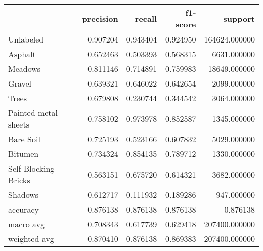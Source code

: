 \begin{tabular}{lrrrr}
\toprule
{} &  precision &    recall &  f1-score &        support \\
\midrule
Unlabeled            &   0.907204 &  0.943404 &  0.924950 &  164624.000000 \\
Asphalt              &   0.652463 &  0.503393 &  0.568315 &    6631.000000 \\
Meadows              &   0.811146 &  0.714891 &  0.759983 &   18649.000000 \\
Gravel               &   0.639321 &  0.646022 &  0.642654 &    2099.000000 \\
Trees                &   0.679808 &  0.230744 &  0.344542 &    3064.000000 \\
Painted metal sheets &   0.758102 &  0.973978 &  0.852587 &    1345.000000 \\
Bare Soil            &   0.725193 &  0.523166 &  0.607832 &    5029.000000 \\
Bitumen              &   0.734324 &  0.854135 &  0.789712 &    1330.000000 \\
Self-Blocking Bricks &   0.563151 &  0.675720 &  0.614321 &    3682.000000 \\
Shadows              &   0.612717 &  0.111932 &  0.189286 &     947.000000 \\
accuracy             &   0.876138 &  0.876138 &  0.876138 &       0.876138 \\
macro avg            &   0.708343 &  0.617739 &  0.629418 &  207400.000000 \\
weighted avg         &   0.870410 &  0.876138 &  0.869383 &  207400.000000 \\
\bottomrule
\end{tabular}
